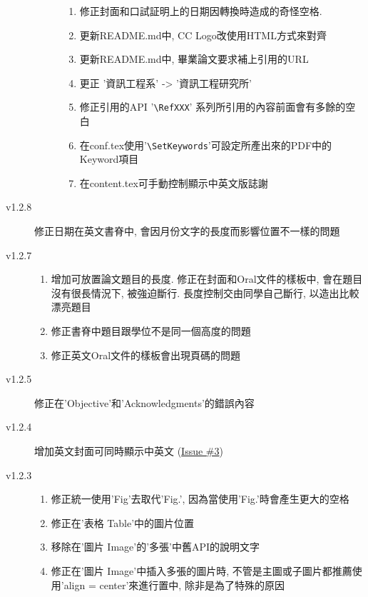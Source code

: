 \begin{description}
\begin{description}
\begin{enumerate}
          \item 修正封面和口試証明上的日期因轉換時造成的奇怪空格.
          \item 更新README.md中, CC Logo改使用HTML方式來對齊
          \item 更新README.md中, 畢業論文要求補上引用的URL
          \item 更正 '資訊工程系' -> '資訊工程研究所'
          \item 修正引用的API '\verb|\RefXXX|' 系列所引用的內容前面會有多餘的空白
          \item 在conf.tex使用'\verb|\SetKeywords|'可設定所產出來的PDF中的Keyword項目
          \item 在content.tex可手動控制顯示中英文版誌謝
        \end{enumerate}
    \end{description}

  \item[v1.2.8] 修正日期在英文書脊中, 會因月份文字的長度而影響位置不一樣的問題

  \item[v1.2.7] \hfill
    \begin{enumerate}
      \item 增加可放置論文題目的長度. 修正在封面和Oral文件的樣板中, 會在題目沒有很長情況下, 被強迫斷行. 長度控制交由同學自己斷行, 以造出比較漂亮題目
      \item 修正書脊中題目跟學位不是同一個高度的問題
      \item 修正英文Oral文件的樣板會出現頁碼的問題
    \end{enumerate}

  \item[v1.2.5] 修正在'Objective'和'Acknowledgments'的錯誤內容

  \item[v1.2.4] 增加英文封面可同時顯示中英文 (\href{https://github.com/wengan-li/ncku-thesis-template-latex/issues/3}{Issue \#3})

  \item[v1.2.3] \hfill
    \begin{enumerate}
      \item 修正統一使用'Fig'去取代'Fig.', 因為當使用'Fig.'時會產生更大的空格
      \item 修正在'表格 Table'中的圖片位置
      \item 移除在'圖片 Image'的'多張'中舊API的說明文字
      \item 修正在'圖片 Image'中插入多張的圖片時, 不管是主圖或子圖片都推薦使用'align = center'來進行置中, 除非是為了特殊的原因
    \end{enumerate}


\end{description}

